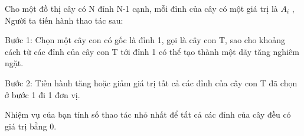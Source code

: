Cho một đồ thị cây có N đỉnh N-1 cạnh, mỗi đỉnh của cây có một giá trị là $A_{i}$ , Người ta tiến hành thao tác sau:

Bước 1: Chọn một cây con có gốc là đỉnh 1, gọi là cây con T, sao cho khoảng cách từ các đỉnh của cây con T tới đỉnh 1 có thể tạo thành một dãy tăng nghiêm ngặt.

Bước 2: Tiến hành tăng hoặc giảm giá trị tất cả các đỉnh của cây con T đã chọn ở bước 1 đi 1 đơn vị.

Nhiệm vụ của bạn tính số thao tác nhỏ nhất để tất cả các đỉnh của cây đều có giá trị bằng 0.